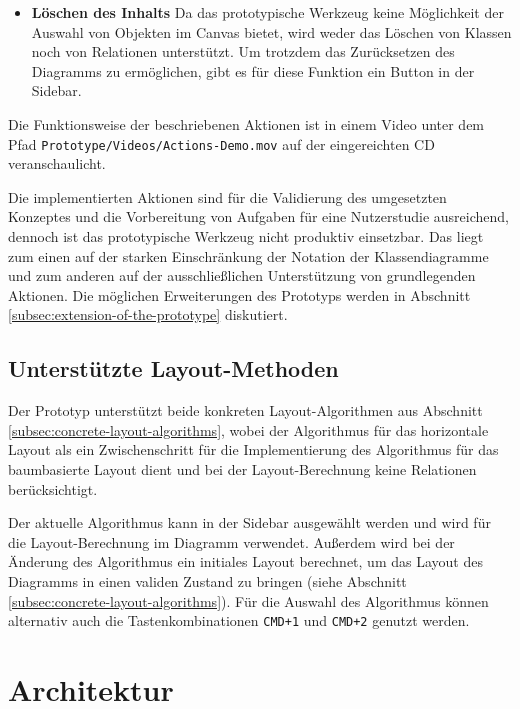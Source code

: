 \begin{itemize}
\item
\textbf{Löschen des Inhalts}
Da das prototypische Werkzeug keine Möglichkeit der Auswahl von Objekten im Canvas bietet, wird weder das Löschen von Klassen noch von Relationen unterstützt. Um trotzdem das Zurücksetzen des Diagramms zu ermöglichen, gibt es für diese Funktion ein Button in der Sidebar.

\end{itemize}

Die Funktionsweise der beschriebenen Aktionen ist in einem Video unter dem Pfad \texttt{Proto\-type/Videos/Actions-Demo.mov} auf der eingereichten CD veranschaulicht.

Die implementierten Aktionen sind für die Validierung des umgesetzten Konzeptes und die Vorbereitung von Aufgaben für eine Nutzerstudie ausreichend, dennoch ist das prototypische Werkzeug nicht produktiv einsetzbar. Das liegt zum einen auf der starken Einschränkung der Notation der Klassendiagramme und zum anderen auf der ausschließlichen Unterstützung von grundlegenden Aktionen. Die möglichen Erweiterungen des Prototyps werden in Abschnitt \ref{subsec:extension-of-the-prototype} diskutiert.

\subsection{Unterstützte Layout-Methoden}
\label{subsec:supported-layout-methods}

Der Prototyp unterstützt beide konkreten Layout-Algorithmen aus Abschnitt \ref{subsec:concrete-layout-algorithms}, wobei der Algorithmus für das horizontale Layout als ein Zwischenschritt für die Implementierung des Algorithmus für das baumbasierte Layout dient und bei der Layout-Berechnung keine Relationen berücksichtigt.

Der aktuelle Algorithmus kann in der Sidebar ausgewählt werden und wird für die Layout-Berechnung im Diagramm verwendet. Außerdem wird bei der Änderung des Algorithmus ein initiales Layout berechnet, um das Layout des Diagramms in einen validen Zustand zu bringen (siehe Abschnitt \ref{subsec:concrete-layout-algorithms}). Für die Auswahl des Algorithmus können alternativ auch die Tastenkombinationen \texttt{CMD+1} und \texttt{CMD+2} genutzt werden.

\section{Architektur}
\label{sec:architecture}

